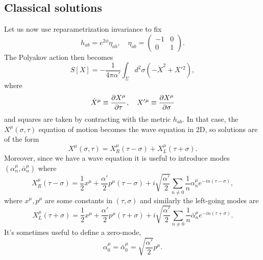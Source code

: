 \subsection*{Classical solutions} Let us now use reparametrization invariance to fix
\begin{equation}
    h_{ab}=e^{2\phi} \eta_{ab}, \quad \eta_{ab}=\begin{pmatrix}
    -1 & 0\\
    0 & 1
    \end{pmatrix}.
\end{equation}
The Polyakov action then becomes
\begin{equation}
    S[X]=-\frac{1}{4\pi \alpha'} \int_\Sigma d^2 \sigma(-\dot X^2 + X'{}^2),
\end{equation}
where
\begin{equation}
    \dot X^\mu \equiv \P{X^\mu}{\tau},\quad X'{}^\mu \equiv \P{X^\mu}{\sigma}
\end{equation}
and squares are taken by contracting with the metric $h_{ab}$. In that case, the $X^\mu(\sigma,\tau)$ equation of motion becomes the wave equation in 2D, %
so solutions are of the form
\begin{equation}
    X^\mu(\sigma,\tau)= X^\mu_R (\tau-\sigma)+X^\mu_L(\tau + \sigma).
\end{equation}
Moreover, since we have a wave equation it is useful to introduce modes $(\alpha^\mu_n, \bar \alpha^\mu_n)$ where
\begin{equation}
    X^\mu_R(\tau-\sigma)=\frac{1}{2}x^\mu +\frac{\alpha'}{2}p^\mu(\tau-\sigma) +i\sqrt{\frac{\alpha'}{2}}\sum_{n\neq 0} \frac{1}{n}
    \alpha^\mu_n e^{-in(\tau-\sigma)},
\end{equation}
where $x^\mu, p^\mu$ are some constants in $(\tau,\sigma)$ and  similarly the left-going modes are
\begin{equation}
    X^\mu_L(\tau+\sigma)=\frac{1}{2}x^\mu +\frac{\alpha'}{2}p^\mu(\tau+\sigma) +i\sqrt{\frac{\alpha'}{2}}\sum_{n\neq 0} \frac{1}{n}
    \bar\alpha^\mu_n e^{-in(\tau+\sigma)}.
\end{equation}
It's sometimes useful to define a zero-mode,
\begin{equation}
    \alpha_0^\mu = \bar \alpha_0^\mu = \sqrt{\frac{\alpha'}{2}}p^\mu.
\end{equation}